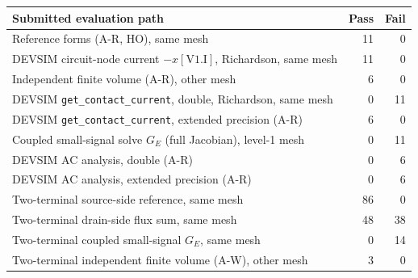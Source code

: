 \begin{tabular}{@{}lrr@{}}
\toprule
Submitted evaluation path & Pass & Fail \\
\midrule
Reference forms (A-R, HO), same mesh & 11 & 0 \\
DEVSIM circuit-node current $-x[\mathrm{V1.I}]$, Richardson, same mesh & 11 & 0 \\
Independent finite volume (A-R), other mesh & 6 & 0 \\
DEVSIM \texttt{get\_contact\_current}, double, Richardson, same mesh & 0 & 11 \\
DEVSIM \texttt{get\_contact\_current}, extended precision (A-R) & 6 & 0 \\
Coupled small-signal solve $G_E$ (full Jacobian), level-1 mesh & 0 & 11 \\
DEVSIM AC analysis, double (A-R) & 0 & 6 \\
DEVSIM AC analysis, extended precision (A-R) & 0 & 6 \\
\midrule
Two-terminal source-side reference, same mesh & 86 & 0 \\
Two-terminal drain-side flux sum, same mesh & 48 & 38 \\
Two-terminal coupled small-signal $G_E$, same mesh & 0 & 14 \\
Two-terminal independent finite volume (A-W), other mesh & 3 & 0 \\
\bottomrule
\end{tabular}
